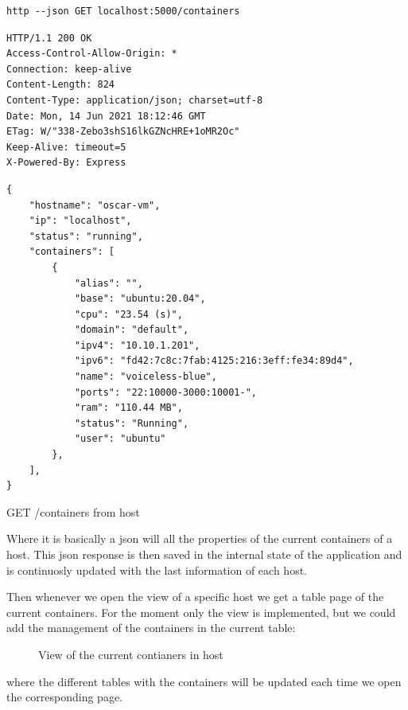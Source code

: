 \begin{listing}[H]
\begin{verbatim}
http --json GET localhost:5000/containers
\end{verbatim}
\begin{verbatim}
HTTP/1.1 200 OK
Access-Control-Allow-Origin: *
Connection: keep-alive
Content-Length: 824
Content-Type: application/json; charset=utf-8
Date: Mon, 14 Jun 2021 18:12:46 GMT
ETag: W/"338-Zebo3shS16lkGZNcHRE+1oMR2Oc"
Keep-Alive: timeout=5
X-Powered-By: Express
\end{verbatim}
\begin{verbatim}
{
    "hostname": "oscar-vm",
    "ip": "localhost",
    "status": "running",
    "containers": [
        {
            "alias": "",
            "base": "ubuntu:20.04",
            "cpu": "23.54 (s)",
            "domain": "default",
            "ipv4": "10.10.1.201",
            "ipv6": "fd42:7c8c:7fab:4125:216:3eff:fe34:89d4",
            "name": "voiceless-blue",
            "ports": "22:10000-3000:10001-",
            "ram": "110.44 MB",
            "status": "Running",
            "user": "ubuntu"
        },
    ],
}
\end{verbatim}
\caption[API request]{\footnotesize{GET /containers from host}}
\end{listing}

Where it is basically a json will all the properties of the current containers of a host. This json response is then saved in the internal state of the application and is continuosly updated with the last information of each host.

\newpage
Then whenever we open the view of a specific host we get a table page of the current containers. For the moment only the view is implemented, but we could add the management of the containers in the current table:
\begin{figure}[H]
\label{fig:lxce list}
\centering
{}
\caption[web-admin containers view]{\footnotesize{View of the current contianers in host}}
\end{figure}

where the different tables with the containers will be updated each time we open the corresponding page.

